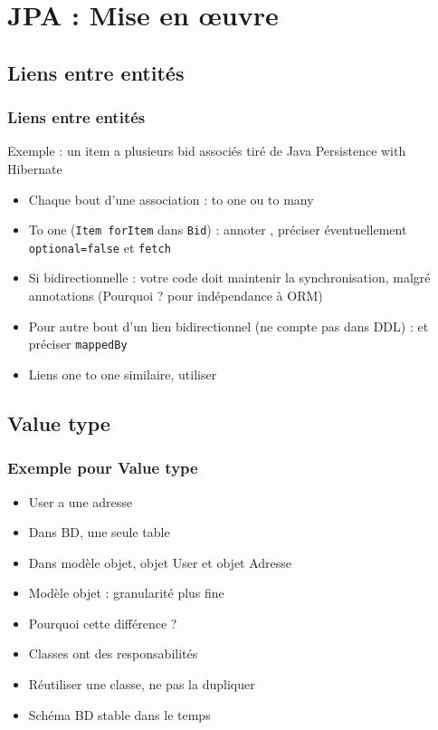 \documentclass[english, french]{beamer}
\begin{document}
\section{JPA : Mise en œuvre}
\subsection{Liens entre entités}
\begin{frame}
	\frametitle{Liens entre entités}
	Exemple : un item a plusieurs bid associés {\tiny tiré de Java Persistence with Hibernate}
	\begin{itemize}
		\item Chaque bout d’une association : to one ou to many
		\item To one (\texttt{Item forItem} dans \texttt{Bid}) : annoter , préciser éventuellement \texttt{optional=false} {\tiny et \texttt{fetch}}
		\item Si bidirectionnelle : votre code doit maintenir la synchronisation, malgré annotations (Pourquoi ? \pause pour indépendance à ORM)\pause
		\item Pour autre bout d’un lien bidirectionnel (ne compte pas dans DDL) :  et préciser \texttt{mappedBy}
		\item Liens one to one similaire, utiliser 
	\end{itemize}
\end{frame}

\subsection{Value type}
\begin{frame}
	\frametitle{Exemple pour Value type}
	\begin{itemize}
		\item User a une adresse
		\item Dans BD, une seule table
		\item Dans modèle objet, objet User et objet Adresse
		\item Modèle objet : granularité plus fine
		\item Pourquoi cette différence ? \pause
		\item Classes ont des responsabilités
		\item Réutiliser une classe, ne pas la dupliquer
		\item Schéma BD stable dans le temps
	\end{itemize}
\end{frame}
\end{document}
